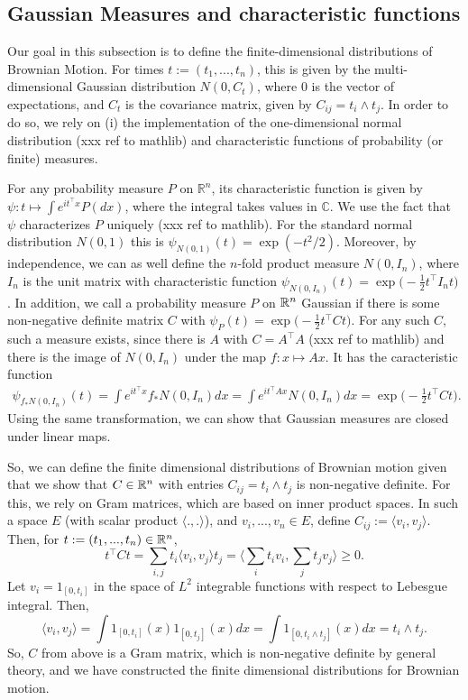 \documentclass[lean]{Draft}
\begin{document}
\subsection{Gaussian Measures and characteristic functions}
\label{ss:char}
Our goal in this subsection is to define the finite-dimensional distributions of Brownian Motion. For times $t := (t_1, ..., t_n)$, this is given by the multi-dimensional Gaussian distribution $N(0, C_t)$, where $0$ is the vector of expectations, and $C_t$ is the covariance matrix, given by $C_{ij} = t_i \wedge t_j$. In order to do so, we rely on (i) the implementation of the one-dimensional normal distribution (xxx ref to mathlib) and characteristic functions of probability (or finite) measures.

For any probability measure $P$ on $\mathbb R^n$, its characteristic function is given by $\psi: t \mapsto \int e^{it^\top x} P(dx)$, where the integral takes values in $\mathbb C$. We use the fact that $\psi$ characterizes $P$ uniquely (xxx ref to mathlib). For the standard normal distribution $N(0,1)$ this is $\psi_{N(0,1)}(t) = \exp(-t^2/2)$. Moreover, by independence, we can as well define the $n$-fold product measure $N(0, I_n)$, where $I_n$ is the unit matrix with characteristic function $\psi_{N(0,I_n)}(t) = \exp\big(-\tfrac 12 t^\top I_n t\big)$. In addition, we call a probability measure $P$ on $\mathbb{R}^n$ Gaussian if there is some non-negative definite matrix $C$ with $\psi_P(t) = \exp\big( - \tfrac 12 t^\top C t\big)$. For any such $C$, such a measure exists, since there is $A$ with $C = A^\top A$ (xxx ref to mathlib) and there is the image of $N(0,I_n)$ under the map $f : x\mapsto Ax$. It has the caracteristic function
\begin{align} \label{eq:gausslin}
\psi_{f_\ast N(0,I_n)}(t) = \int e^{it^\top x} f_\ast N(0,I_n) dx = \int e^{it^\top A x} N(0,I_n) dx = \exp\big( - \tfrac 12 t^\top C t\big).
\end{align}
Using the same transformation, we can show that Gaussian measures are closed under linear maps.

So, we can define the finite dimensional distributions of Brownian motion given that we show that $C \in \mathbb{R}^n$ with entries $C_{ij} = t_i \wedge t_j$ is non-negative definite. For this, we rely on Gram matrices, which are based on inner product spaces. In such a space $E$ (with scalar product $\langle .,. \rangle$), and $v_i,...,v_n \in E$, define $C_{ij} := \langle v_i, v_j\rangle$. Then, for $t :=(t_1,...,t_n) \in \mathbb{R}^n$,
$$ t^\top C t = \sum_{i,j} t_i \langle v_i, v_j\rangle t_j = \Big\langle \sum_i t_i v_i, \sum_j t_j v_j\Big\rangle \geq 0.$$
Let $v_i = 1_{[0,t_i]}$ in the space of $L^2$ integrable functions with respect to Lebesgue integral. Then,
$$ \langle v_i, v_j \rangle = \int 1_{[0,t_i]}(x) 1_{[0,t_j]}(x) dx = \int 1_{[0,t_i \wedge t_j]}(x) dx = t_i \wedge t_j.$$
So, $C$ from above is a Gram matrix, which is non-negative definite by general theory, and we have constructed the finite dimensional distributions for Brownian motion.
\end{document}

